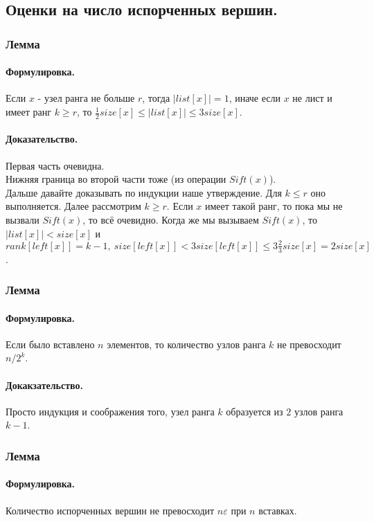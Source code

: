 \documentclass{article}
\begin{document}
	\subsection{Оценки на число испорченных вершин.\\}
	\subsubsection{Лемма}
		\paragraph{Формулировка.}
		Если $x$ - узел ранга не больше $r$, тогда $|list[x]| = 1$, иначе если $x$ не лист и имеет ранг $k \geq r$, то $\frac{1}{2}size[x] \leq |list[x]| \leq 3size[x]$.
		\paragraph{Доказательство.}
		Первая часть очевидна. \\
		Нижняя граница во второй части тоже (из операции $Sift(x)$).\\
		Дальше давайте доказывать по индукции наше утверждение. Для $k \leq r$ оно выполняется. Далее рассмотрим $k \geq r$. Если $x$ имеет такой ранг, то пока мы не вызвали $Sift(x)$, то всё очевидно. Когда же мы вызываем $Sift(x)$, то $|list[x]| < size[x]$ и $rank[left[x]] = k - 1,\ size[left[x]] < 3size[left[x]] \leq 3 \frac{2}{3}size[x] = 2size[x]$.
	\subsubsection{Лемма}
		\paragraph{Формулировка.}
		Если было вставлено $n$ элементов, то количество узлов ранга $k$ не превосходит $n/2^k$.  
		\paragraph{Докакзательство.}
		Просто индукция и соображения того, узел ранга $k$ образуется из $2$ узлов ранга $k - 1$.
	\subsubsection{Лемма}
		\paragraph{Формулировка.}
		Количество испорченных вершин не превосходит $n\varepsilon$ при $n$ вставках.
\end{document}
